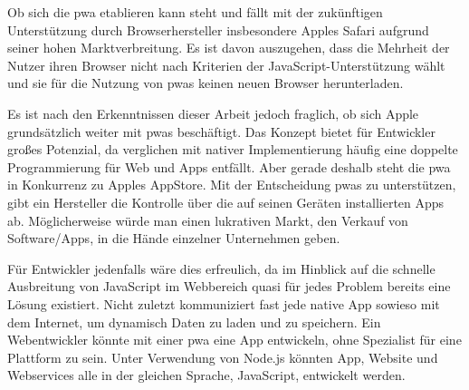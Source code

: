Ob sich die \ac{pwa} etablieren kann steht und fällt mit der zukünftigen Unterstützung durch Browserhersteller insbesondere Apples Safari aufgrund seiner hohen Marktverbreitung. Es ist davon auszugehen, dass die Mehrheit der Nutzer ihren Browser nicht nach Kriterien der JavaScript-Unterstützung wählt und sie für die Nutzung von \ac{pwa}s keinen neuen Browser herunterladen.

Es ist nach den Erkenntnissen dieser Arbeit jedoch fraglich, ob sich Apple grundsätzlich weiter mit \ac{pwa}s beschäftigt. Das Konzept bietet für Entwickler großes Potenzial, da verglichen mit nativer Implementierung häufig eine doppelte Programmierung für Web und Apps entfällt. Aber gerade deshalb steht die \ac{pwa} in Konkurrenz zu Apples AppStore. Mit der Entscheidung \ac{pwa}s zu unterstützen, gibt ein Hersteller die Kontrolle über die auf seinen Geräten installierten Apps ab. 
Möglicherweise würde man einen lukrativen Markt, den Verkauf von Software/Apps, in die Hände einzelner Unternehmen geben.

Für Entwickler jedenfalls wäre dies erfreulich, da im Hinblick auf die schnelle Ausbreitung von JavaScript im Webbereich quasi für jedes Problem bereits eine Lösung existiert. Nicht zuletzt kommuniziert fast jede native App sowieso mit dem Internet, um dynamisch Daten zu laden und zu speichern. Ein Webentwickler könnte mit einer \ac{pwa} eine App entwickeln, ohne Spezialist für eine Plattform zu sein. Unter Verwendung von Node.js könnten App, Website und Webservices alle in der gleichen Sprache, JavaScript, entwickelt werden.
